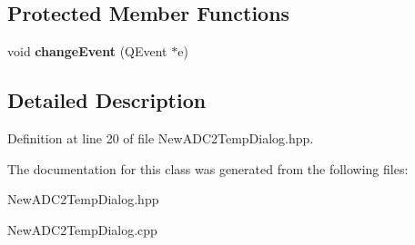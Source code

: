 \subsection*{Protected Member Functions}
\begin{DoxyCompactItemize}
\item 
\mbox{\label{class_new_a_d_c2_temp_dialog_ad134682522a39b4843feae7662574ace}} 
void {\bfseries change\+Event} (Q\+Event $\ast$e)
\end{DoxyCompactItemize}


\subsection{Detailed Description}


Definition at line 20 of file New\+A\+D\+C2\+Temp\+Dialog.\+hpp.



The documentation for this class was generated from the following files\+:\begin{DoxyCompactItemize}
\item 
New\+A\+D\+C2\+Temp\+Dialog.\+hpp\item 
New\+A\+D\+C2\+Temp\+Dialog.\+cpp\end{DoxyCompactItemize}
